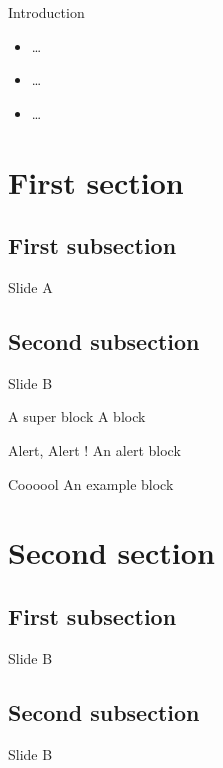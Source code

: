 
	\begin{frame}
		\titlepage
	\end{frame}
	\begin{frame}
		\tableofcontents
	\end{frame}
	\begin{frame}{Introduction}
		\begin{itemize}
			\item \ldots 
			\item \ldots 
			\item \ldots
		\end{itemize}
	\end{frame}
	\section{First section}
	\subsection{First subsection}
	\begin{frame}{Slide A}
		
	\end{frame}
	\subsection{Second subsection}

	\begin{frame}{Slide B}
		\begin{block}{A super block}
			A block	
		\end{block}
		\begin{alertblock}{Alert, Alert !}
			An alert block
		\end{alertblock}

		\begin{exampleblock}{Coooool}
			An example block	
		\end{exampleblock}
	\end{frame}
	\section{Second section}
	\subsection{First subsection}
	\begin{frame}{Slide B}
	\end{frame}
	\subsection{Second subsection}
	\begin{frame}{Slide B}
	\end{frame}
